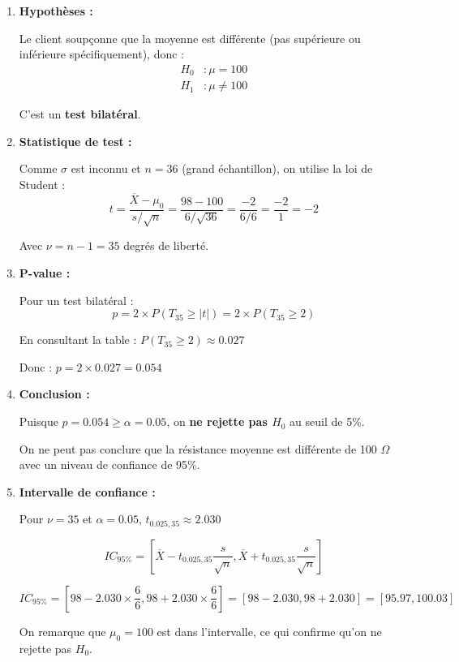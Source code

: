 \documentclass[11pt,a4paper]{article}
\begin{document}
\begin{enumerate}
    \item \textbf{Hypothèses :}
    
    Le client soupçonne que la moyenne est différente (pas supérieure ou inférieure spécifiquement), donc :
    \begin{align*}
        H_0 &: \mu = 100 \\
        H_1 &: \mu \neq 100
    \end{align*}
    
    C'est un \textbf{test bilatéral}.
    
    \item \textbf{Statistique de test :}
    
    Comme $\sigma$ est inconnu et $n = 36$ (grand échantillon), on utilise la loi de Student :
    $$t = \frac{\overline{X} - \mu_0}{s/\sqrt{n}} = \frac{98 - 100}{6/\sqrt{36}} = \frac{-2}{6/6} = \frac{-2}{1} = -2$$
    
    Avec $\nu = n - 1 = 35$ degrés de liberté.
    
    \item \textbf{P-value :}
    
    Pour un test bilatéral :
    $$p = 2 \times P(T_{35} \geq |t|) = 2 \times P(T_{35} \geq 2)$$
    
    En consultant la table : $P(T_{35} \geq 2) \approx 0.027$
    
    Donc : $p = 2 \times 0.027 = 0.054$
    
    \item \textbf{Conclusion :}
    
    Puisque $p = 0.054 \geq \alpha = 0.05$, on \textbf{ne rejette pas $H_0$} au seuil de 5\%.
    
    On ne peut pas conclure que la résistance moyenne est différente de 100 $\Omega$ avec un niveau de confiance de 95\%.
    
    \item \textbf{Intervalle de confiance :}
    
    Pour $\nu = 35$ et $\alpha = 0.05$, $t_{0.025, 35} \approx 2.030$
    
    $$IC_{95\%} = \left[\overline{X} - t_{0.025, 35} \frac{s}{\sqrt{n}}, \overline{X} + t_{0.025, 35} \frac{s}{\sqrt{n}}\right]$$
    
    $$IC_{95\%} = \left[98 - 2.030 \times \frac{6}{6}, 98 + 2.030 \times \frac{6}{6}\right] = [98 - 2.030, 98 + 2.030] = [95.97, 100.03]$$
    
    On remarque que $\mu_0 = 100$ est dans l'intervalle, ce qui confirme qu'on ne rejette pas $H_0$.
    

\end{enumerate}
\end{document}
